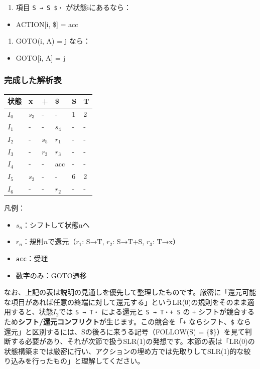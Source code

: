 \begin{enumerate}
\def\labelenumi{\arabic{enumi}.}
\setcounter{enumi}{2}
\tightlist
\item
  項目 \texttt{S\textquotesingle{}\ →\ S\ \$・} が状態iにあるなら：
\end{enumerate}

\begin{itemize}
\tightlist
\item
  ACTION{[}i, \${]} = acc
\end{itemize}

\begin{enumerate}
\def\labelenumi{\arabic{enumi}.}
\setcounter{enumi}{3}
\tightlist
\item
  GOTO(i, A) = j なら：
\end{enumerate}

\begin{itemize}
\tightlist
\item
  GOTO{[}i, A{]} = j
\end{itemize}

\hypertarget{chapter5-ux5b8cux6210ux3057ux305fux89e3ux6790ux8868}{%
\subsubsection{完成した解析表}\label{chapter5-ux5b8cux6210ux3057ux305fux89e3ux6790ux8868}}

\begin{longtable}[]{@{}llllll@{}}
\toprule
状態 & x & + & \$ & S & T\tabularnewline
\midrule
\endhead
\(I_0\) & \(s_3\) & - & - & 1 & 2\tabularnewline
\(I_1\) & - & - & \(s_4\) & - & -\tabularnewline
\(I_2\) & - & \(s_5\) & \(r_1\) & - & -\tabularnewline
\(I_3\) & - & \(r_3\) & \(r_3\) & - & -\tabularnewline
\(I_4\) & - & - & acc & - & -\tabularnewline
\(I_5\) & \(s_3\) & - & - & 6 & 2\tabularnewline
\(I_6\) & - & - & \(r_2\) & - & -\tabularnewline
\bottomrule
\end{longtable}

凡例：

\begin{itemize}
\tightlist
\item
  \(s_n\)：シフトして状態nへ
\item
  \(r_n\)：規則\(n\)で還元（\(r_1\): S→T, \(r_2\): S→T+S, \(r_3\): T→x）
\item
  \texttt{acc}：受理
\item
  数字のみ：GOTO遷移
\end{itemize}

なお、上記の表は説明の見通しを優先して整理したものです。厳密に「還元可能な項目があれば任意の終端に対して還元する」というLR(0)の規則をそのまま適用すると、状態\(I_2\)では
\texttt{S\ →\ T・} による還元と \texttt{S\ →\ T・+\ S} の \texttt{+}
シフトが競合するため\textbf{シフト/還元コンフリクト}が生じます。この競合を「\texttt{+}
ならシフト、\texttt{\$}
なら還元」と区別するには、Sの後ろに来うる記号（FOLLOW(S) =
\{\$\}）を見て判断する必要があり、それが次節で扱うSLR(1)の発想です。本節の表は「LR(0)の状態構築までは厳密に行い、アクションの埋め方では先取りしてSLR(1)的な絞り込みを行ったもの」と理解してください。

